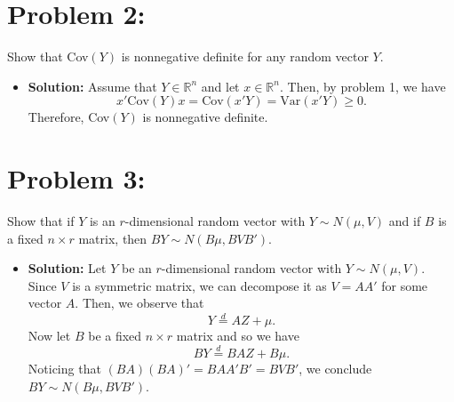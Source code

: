 \documentclass[11pt]{article}
\newcommand{\R}{{\mathbb R}}
\begin{document}
\section*{Problem 2:}
Show that Cov$(Y)$ is nonnegative definite for any random vector $Y$.
\begin{itemize}
\item[] {\bf Solution:}  Assume that $Y\in\R^n$ and let $x\in\R^n$.  Then, by problem 1, we have
\[
x'\text{Cov}(Y)x = \text{Cov}(x'Y) = \text{Var}(x'Y) \geq 0.
\]
Therefore, Cov$(Y)$ is nonnegative definite.
\end{itemize}

\section*{Problem 3:}  
Show that if $Y$ is an $r$-dimensional random vector with $Y\sim N(\mu,V)$ and if $B$ is a fixed $n\times r$ matrix, then $BY\sim N(B\mu, BVB')$.
\begin{itemize}
\item[] {\bf Solution:}  Let $Y$ be an $r$-dimensional random vector with $Y\sim N(\mu,V)$.  Since $V$ is a symmetric matrix, we can decompose it as $V=AA'$ for some vector $A$.  Then, we observe that
\[
Y \overset{d}{=} AZ + \mu.
\]
Now let $B$ be a fixed $n\times r$ matrix and so we have
\[
BY \overset{d}{=} BAZ + B\mu.
\]
Noticing that $(BA)(BA)' = BAA'B' = BVB'$, we conclude $BY \sim N(B\mu,BVB')$.
\end{itemize}
\newpage
\end{document}
